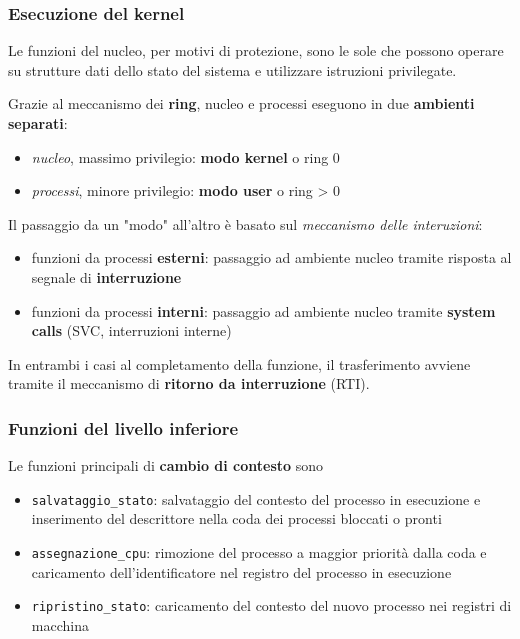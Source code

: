 \subsubsection{Esecuzione del kernel}
Le funzioni del nucleo, per motivi di protezione, sono le sole che possono operare su strutture dati dello stato del sistema e utilizzare istruzioni privilegate.

Grazie al meccanismo dei \textbf{ring}, nucleo e processi eseguono in due \textbf{ambienti separati}:
\begin{itemize}
    \item \textit{nucleo}, massimo privilegio: \textbf{modo kernel} o ring 0
    \item \textit{processi}, minore privilegio: \textbf{modo user} o ring > 0
\end{itemize}

Il passaggio da un "modo" all'altro è basato sul \textit{meccanismo delle interuzioni}:
\begin{itemize}
    \item funzioni da processi \textbf{esterni}: passaggio ad ambiente nucleo tramite risposta al segnale di \textbf{interruzione}
    \item funzioni da processi \textbf{interni}: passaggio ad ambiente nucleo tramite \textbf{system calls} (SVC, interruzioni interne)
\end{itemize}

In entrambi i casi al completamento della funzione, il trasferimento avviene tramite il meccanismo di \textbf{ritorno da interruzione} (RTI).

\subsubsection{Funzioni del livello inferiore}
Le funzioni principali di \textbf{cambio di contesto} sono
\begin{itemize}
    \item \texttt{salvataggio_stato}: salvataggio del contesto del processo in esecuzione e inserimento del descrittore nella coda dei processi bloccati o pronti
    \item \texttt{assegnazione_cpu}: rimozione del processo a maggior priorità dalla coda e caricamento dell'identificatore nel registro del processo in esecuzione
    \item \texttt{ripristino_stato}: caricamento del contesto del nuovo processo nei registri di macchina
\end{itemize}


